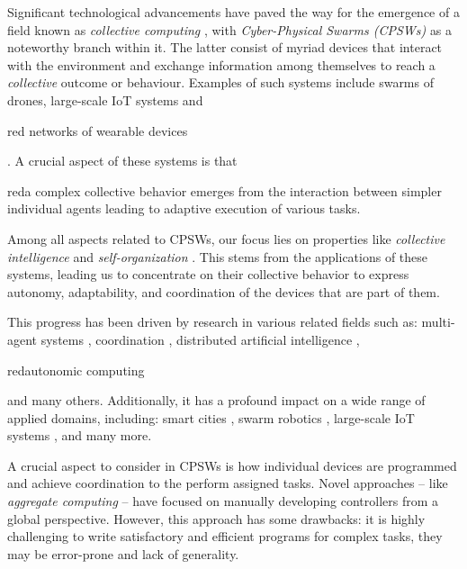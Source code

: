 \documentclass[12pt,a4paper,openright,twoside]{book}
\begin{document}
Significant technological advancements have paved the way for the emergence of a field known as \emph{collective computing} 
    \cite{abowd2016beyond}, with \emph{Cyber-Physical Swarms (CPSWs)} \cite{schranz2021swarm} as a noteworthy branch within it.
    The latter consist of myriad devices that interact with the environment and exchange information among themselves
    to reach a \emph{collective} outcome or behaviour. Examples of such systems include swarms of drones, 
    large-scale IoT systems and \begin{color}{red} networks of wearable devices \cite{10.1145/2800835.2809505, fortino2018wearable}\end{color}.
    A crucial aspect of these systems is that \begin{color}{red}a complex collective behavior emerges from the interaction between 
    simpler individual agents leading to adaptive execution of various tasks. \end{color}
    Among all aspects related to CPSWs, our focus lies on properties like \emph{collective intelligence} \cite{tumer2004survey} 
    and \emph{self-organization} \cite{schmeck2011organic}. This stems from the applications of these systems, leading us to 
    concentrate on their collective behavior to express autonomy, adaptability, and coordination of the devices 
    that are part of them.

This progress has been driven by research in various related fields such as: multi-agent systems \cite{dorri2018multi},
    coordination \cite{yang2022overview}, distributed artificial intelligence \cite{bond2014readings}, 
    \begin{color}{red}autonomic computing \cite{parashar2004autonomic}\end{color} and many others. 
    Additionally, it has a profound impact on a wide range of applied domains, including: smart cities \cite{zedadra2019swarm}, 
    swarm robotics \cite{brambilla2013swarm}, large-scale IoT systems \cite{uslu2023role}, and many more.

A crucial aspect to consider in CPSWs is how individual devices are programmed and achieve coordination to the perform assigned tasks. 
    Novel approaches -- like \emph{aggregate computing} \cite{VIROLI2019100486} -- have focused on manually developing
    controllers from a global perspective. However, this approach has some drawbacks: it is highly challenging to write satisfactory 
    and efficient programs for complex tasks, they may be error-prone and lack of generality.
\end{document}
